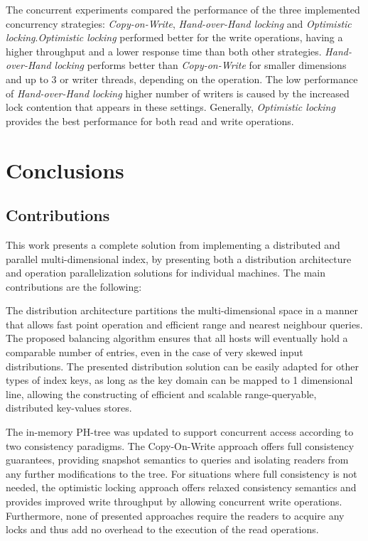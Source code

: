 \documentclass[11pt,a4paper]{globis-book}
\begin{document}
The concurrent experiments compared the performance of the three implemented concurrency strategies: \textit{Copy-on-Write}, \textit{Hand-over-Hand locking} and \textit{Optimistic locking}.\textit{Optimistic locking} performed better for the write operations, having a higher throughput and a lower response time than both other strategies. \textit{Hand-over-Hand locking} performs better than \textit{Copy-on-Write} for smaller dimensions and up to 3 or writer threads, depending on the operation. The low performance of \textit{Hand-over-Hand locking} higher number of writers is caused by the increased lock contention that appears in these settings. Generally, \textit{Optimistic locking} provides the best performance for both read and write operations.

\chapter{Conclusions}
\label{ch:conclusions}

\section{Contributions}
\label{sec:conclusions-contribution}

This work presents a complete solution from implementing a distributed and parallel multi-dimensional index, by presenting both a distribution architecture and operation parallelization solutions for individual machines. The main contributions are the following:

The distribution architecture partitions the multi-dimensional space in a manner that allows fast point operation and efficient range and nearest neighbour queries. The proposed balancing algorithm ensures that all hosts will eventually hold a comparable number of entries, even in the case of very skewed input distributions. The presented distribution solution can be easily adapted for other types of index keys, as long as the key domain can be mapped to 1 dimensional line, allowing the constructing of efficient and scalable range-queryable, distributed key-values stores.

The in-memory PH-tree was updated to support concurrent access according to two consistency paradigms. The Copy-On-Write approach offers full consistency guarantees, providing snapshot semantics to queries and isolating readers from any further modifications to the tree. For situations where full consistency is not needed, the optimistic locking approach offers relaxed consistency semantics and provides improved write throughput by allowing concurrent write operations. Furthermore, none of presented approaches require the readers to acquire any locks and thus add no overhead to the execution of the read operations. 
\end{document}
